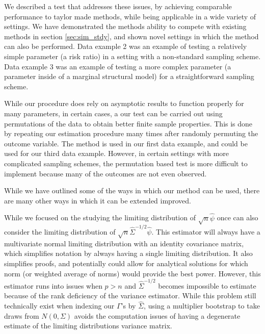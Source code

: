 \documentclass{article}
\begin{document}
We described a test that addresses these issues, by achieving comparable performance to taylor made methods, while being applicable in a wide variety of settings.  We have demonstrated the methods ability to compete with existing methods in section \ref{sec:sim_stdy}, and shown novel settings in which the method can also be performed.  Data example 2 was an example of testing a relatively simple parameter (a risk ratio) in a setting with a non-standard sampling scheme.  Data example 3 was an example of testing a more complex parameter (a parameter inside of a marginal structural model) for a straightforward sampling scheme.  

While our procedure does rely on asymptotic results to function properly for many parameters, in certain cases, a our test can be carried out using permutations of the data to obtain better finite sample properties.  This is done by repeating our estimation procedure many times after randomly permuting the outcome variable.  The method is used in our first data example, and could be used for our third data example.  However, in certain settings with more complicated sampling schemes, the permutation based test is more difficult to implement because many of the outcomes are not even observed.

While we have outlined some of the ways in which our method can be used, there are many other ways in which it can be extended improved. 

While we focused on the studying the limiting distribution of $\sqrt{n}\hat{\psi}$ once can also consider the limiting distribution of $\sqrt{n}\hat{\Sigma}^{-1/2}\hat{\psi}$.  This estimator will always have a multivariate normal limiting distribution with an identity covariance matrix, which simplifies notation by always having a single limiting distribution.  It also simplifies proofs, and potentially could allow for analytical solutions for which norm (or weighted average of norms) would provide the best power.  However, this estimator runs into issues when $p > n$ and $\hat{\Sigma}^{-1/2}$ becomes impossible to estimate because of the rank deficiency of the variance estimator.  While this problem still technically exist when indexing our $\Gamma$'s by $\hat{\Sigma}$, using a multiplier bootstrap to take draws from $N(0, \Sigma)$ avoids the computation issues of having a degenerate estimate of the limiting distributions variance matrix.
\end{document}
